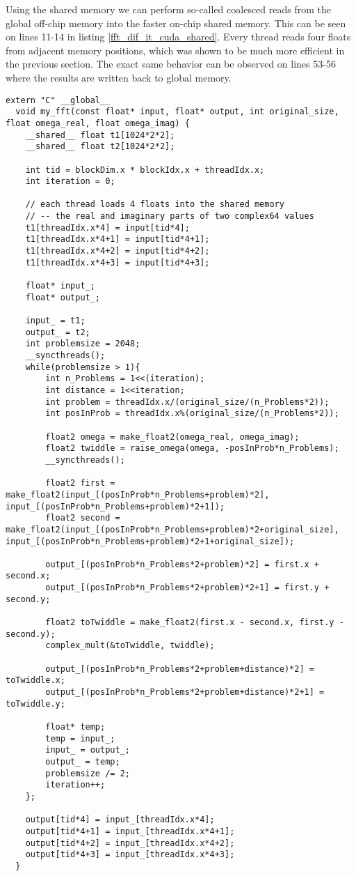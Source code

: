 \documentclass[english,11pt,a4paper,table]{article} %
\begin{document}
Using the shared memory we can perform so-called coalesced reads from the global off-chip memory into the faster on-chip shared memory. This can be seen on lines 11-14 in listing \ref{fft_dif_it_cuda_shared}. Every thread reads four floats from adjacent memory positions, which was shown to be much more efficient in the previous section. The exact same behavior can be observed on lines  53-56 where the results are written back to global memory.

\begin{verbatim}
extern "C" __global__
  void my_fft(const float* input, float* output, int original_size, float omega_real, float omega_imag) {
    __shared__ float t1[1024*2*2];
    __shared__ float t2[1024*2*2];
    
    int tid = blockDim.x * blockIdx.x + threadIdx.x;
    int iteration = 0;
    
    // each thread loads 4 floats into the shared memory
    // -- the real and imaginary parts of two complex64 values
    t1[threadIdx.x*4] = input[tid*4];
    t1[threadIdx.x*4+1] = input[tid*4+1];
    t1[threadIdx.x*4+2] = input[tid*4+2];
    t1[threadIdx.x*4+3] = input[tid*4+3];
    
    float* input_;
    float* output_;
    
    input_ = t1;
    output_ = t2;
    int problemsize = 2048;
    __syncthreads();
    while(problemsize > 1){
        int n_Problems = 1<<(iteration);
        int distance = 1<<iteration;
        int problem = threadIdx.x/(original_size/(n_Problems*2));
        int posInProb = threadIdx.x%(original_size/(n_Problems*2));

        float2 omega = make_float2(omega_real, omega_imag);
        float2 twiddle = raise_omega(omega, -posInProb*n_Problems);
        __syncthreads();

        float2 first = make_float2(input_[(posInProb*n_Problems+problem)*2], input_[(posInProb*n_Problems+problem)*2+1]);
        float2 second = make_float2(input_[(posInProb*n_Problems+problem)*2+original_size], input_[(posInProb*n_Problems+problem)*2+1+original_size]);

        output_[(posInProb*n_Problems*2+problem)*2] = first.x + second.x;
        output_[(posInProb*n_Problems*2+problem)*2+1] = first.y + second.y;

        float2 toTwiddle = make_float2(first.x - second.x, first.y - second.y);
        complex_mult(&toTwiddle, twiddle);

        output_[(posInProb*n_Problems*2+problem+distance)*2] = toTwiddle.x;
        output_[(posInProb*n_Problems*2+problem+distance)*2+1] = toTwiddle.y;
        
        float* temp;
        temp = input_;
        input_ = output_;
        output_ = temp;
        problemsize /= 2;
        iteration++;
    };

    output[tid*4] = input_[threadIdx.x*4];
    output[tid*4+1] = input_[threadIdx.x*4+1];
    output[tid*4+2] = input_[threadIdx.x*4+2];
    output[tid*4+3] = input_[threadIdx.x*4+3];
  }
\end{verbatim}
\end{document}

